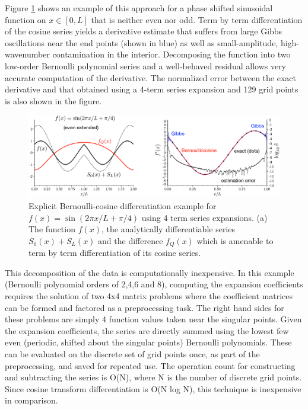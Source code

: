 \documentclass{jfm-like}
\begin{document}
Figure \ref{fig:trig} shows an example of this approach for a phase shifted sinusoidal function on $x \in [0,L]$ that is neither even nor odd. Term by term differentiation of the cosine series
yields a derivative estimate that suffers from large Gibbs oscillations near the end points (shown in blue) as well as small-amplitude, high-wavenumber contamination in the interior. 
Decomposing the function into two low-order Bernoulli polynomial series and a well-behaved residual allows
very accurate computation of the derivative. The normalized error between the exact derivative and that obtained using a 4-term series expansion and 129 grid points is also shown in the figure.
 \begin{figure}
  \centerline{\includegraphics[width=1.0\textwidth]{../differentiation_w_Bernoulli/FIGS/trig_figs/trig_fig.eps}}
  \caption{Explicit Bernoulli-cosine differentiation example for $f(x)=\sin(2\pi x/L + \pi/4)$ using 4 term series expansions. (a) The function $f(x)$, the analytically differentiable series $S_0(x)+S_L(x)$ and the 
  difference $f_Q(x)$ which is amenable to term by term differentiation of its cosine series.}
   \label{fig:trig}
\end{figure}

This decomposition of the data is computationally inexpensive. In this example (Bernoulli polynomial orders of 2,4,6 and 8), 
computing the expansion coefficients requires the solution of two 4x4 matrix problems where the coefficient matrices can be formed and factored
as a preprocessing task. The right hand sides for these problems are simply  4 function values taken near the singular points. Given the expansion coefficients, the series are directly summed using the lowest few
even (periodic, shifted about the singular points) Bernoulli polynomials. These can be evaluated on the discrete set of grid points once, as part of the preprocessing, and saved for repeated use. The operation count for constructing and subtracting
the series is O(N), where N is the number of discrete grid points. Since cosine transform differentiation is O(N log N), this technique is inexpensive in comparison.
\end{document}
